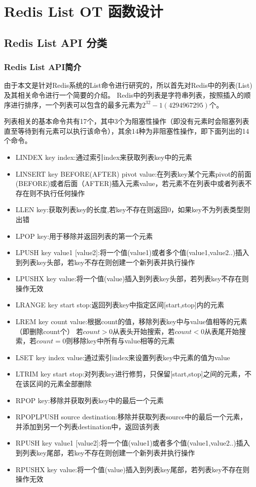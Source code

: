 \chapter{Redis List OT 函数设计}
\label{chapter:design}
\section{Redis List API 分类}
\subsection{Redis List API简介}
\par 由于本文是针对Redis系统的List命令进行研究的，所以首先对Redis中的列表(List)及其相关命令进行一个简要的介绍。
Redis中的列表是字符串列表，按照插入的顺序进行排序，一个列表可以包含的最多元素为$2^{32}-1(4294967295)$个。

\par 列表相关的基本命令共有17个，其中3个为阻塞性操作（即没有元素时会阻塞列表直至等待到有元素可以执行该命令），其余14种为非阻塞性操作，即下面列出的14个命令。\\

\begin{itemize}
\item LINDEX  key index:通过索引index来获取列表key中的元素
\item LINSERT key BEFORE(AFTER) pivot value:在列表key某个元素pivot的前面(BEFORE)或者后面（AFTER)插入元素value，若元素不在列表中或者列表不存在则不执行任何操作
\item LLEN key:获取列表key的长度,若key不存在则返回0，如果key不为列表类型则出错
\item LPOP key:用于移除并返回列表的第一个元素
\item LPUSH key value1 [value2]:将一个值(value1)或者多个值(value1,value2..)插入到列表key头部，若key不存在则创建一个新列表并执行操作
\item LPUSHX key value:将一个值(value)插入到列表key头部，若列表key不存在则操作无效
\item LRANGE key start stop:返回列表key中指定区间[start,stop]内的元素
\item LREM key count value:根据count的值，移除列表key中与value值相等的元素（即删除count个）
若$count > 0$从表头开始搜索，若$count < 0$从表尾开始搜索，若$count = 0$则移除key中所有与value相等的元素
\item LSET key index value:通过索引index来设置列表key中元素的值为value
\item LTRIM key start stop:对列表key进行修剪，只保留[start,stop]之间的元素，不在该区间的元素全部删除
\item RPOP key:移除并获取列表key中的最后一个元素
\item RPOPLPUSH source destination:移除并获取列表source中的最后一个元素，并添加到另一个列表destination中，返回该列表
\item RPUSH key value1 [value2]:将一个值(value1)或者多个值(value1,value2..)插入到列表key尾部，若key不存在则创建一个新列表并执行操作
\item RPUSHX key value:将一个值(value)插入到列表key尾部，若列表key不存在则操作无效
\end{itemize}

